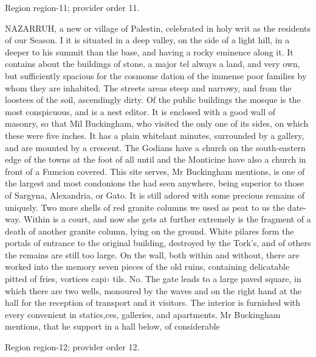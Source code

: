 \documentclass[11pt]{article}
\begin{document}
{\scriptsize\color{gray} Region region-11; provider order 11.\par}
\medskip

NAZARRUH, a new or village of Palestin, celebrated in holy writ as the residents of our Season. I it is situated in a deep valley, on the side of a light hill, in a deeper to his summit than the base, and having a rocky eminence along it. It contains about the buildings of stone, a major tel always a land, and very own, but sufficiently spacious for the cosmome dation of the immense poor families by whom they are inhabited. The streets areas steep and narrowy, and from the loostees of the soil, ascendingly dirty. Of the public buildings the mosque is the most conspicuous, and is a nest editor. It is enclosed with a good wall of masonry, so that Mil Buckingham, who visited the only one of its sides, on which these were five inches. It has a plain whitelant minutes, surrounded by a gallery, and are mounted by a crescent. The Godians have a church on the south-eastern edge of the towns at the foot of all until and the Monticine have also a church in front of a Fumcion covered. This site serves, Mr Buckingham mentions, is one of the largest and most condonions the had seen anywhere, being superior to those of Sargyna, Alexandria, or Gato. It is still adored with some precious remains of uniquely. Two more shells of red granite columns we used as peat to us the date-way. Within is a court, and now she gets at further extremely is the fragment of a death of another granite column, lying on the ground. White pilares form the portals of entrance to the original building, destroyed by the Tork's, and of others the remains are still too large. On the wall, both within and without, there are worked into the memory seven pieces of the old ruins, containing delicatable pitted of fries, vortices capi› tils. No. The gate leads to a large paved square, in which there are two wells, monoured by the waves and on the right hand at the hall for the reception of transport and it visitors. The interior is furnished with every convenient in statics,ces, galleries, and apartments. Mr Buckingham mentions, that he support in a hall below, of considerable
\par

{\scriptsize\color{gray} Region region-12; provider order 12.\par}
\medskip
\end{document}

